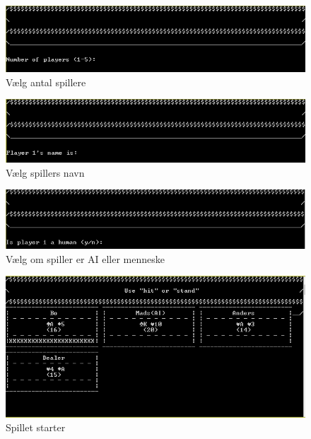 \documentclass[a4paper]{article}
\begin{document}
        \begin{figure}[H]
          \includegraphics{figures/SelectPlayers.PNG}

          \caption{Vælg antal spillere}
          \label{fig:selectPlayers}
        \end{figure}

        \begin{figure}[H]
          \includegraphics{figures/PlayerName.PNG}

          \caption{Vælg spillers navn}
          \label{fig:selectPlayerName}
        \end{figure}

        \begin{figure}[H]
          \includegraphics{figures/PlayerIsHuman.PNG}

          \caption{Vælg om spiller er AI eller menneske}
          \label{fig:selectPlayerIsHuman}
        \end{figure}

        \begin{figure}[H]
          \includegraphics{figures/ScoreBoardDealed.PNG}

          \caption{Spillet starter}
          \label{fig:scoreboardDealed}
        \end{figure}
\end{document}
